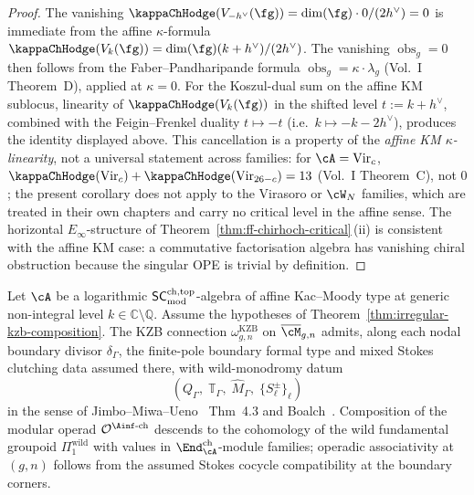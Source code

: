 \begin{proof}
The vanishing $\kappaChHodge(V_{-h^\vee}(\fg)) = \dim(\fg)\cdot 0/(2h^\vee)
= 0$ is immediate from the affine $\kappa$-formula
$\kappaChHodge(V_k(\fg)) = \dim(\fg)(k+h^\vee)/(2h^\vee)$. The vanishing
$\operatorname{obs}_g = 0$ then follows from the
Faber--Pandharipande formula
$\operatorname{obs}_g = \kappa\cdot\lambda_g$
(Vol.~I Theorem~D), applied at $\kappa = 0$. For the Koszul-dual
sum on the affine KM sublocus, linearity of
$\kappaChHodge(V_k(\fg))$ in the shifted level $t := k+h^\vee$, combined
with the Feigin--Frenkel duality $t \mapsto -t$
(i.e.\ $k \mapsto -k-2h^\vee$), produces the identity displayed
above. This cancellation is a property of the
\emph{affine KM $\kappa$-linearity}, not a universal statement
across families: for $\cA = \mathrm{Vir}_c$, $\kappaChHodge(\mathrm{Vir}_c)
+ \kappaChHodge(\mathrm{Vir}_{26-c}) = 13$ (Vol.~I Theorem~C), not $0$; the
present corollary does not apply to the Virasoro or $\cW_N$
families, which are treated in their own chapters and carry no
critical level in the affine sense. The horizontal
$E_\infty$-structure of
Theorem~\ref{thm:ff-chirhoch-critical}\,(ii) is consistent with the
affine KM case: a commutative factorisation algebra has vanishing
chiral obstruction because the singular OPE is trivial by definition.
\end{proof}

\begin{theorem}
\label{thm:irregular-kzb-composition-generic-level}

Let $\cA$ be a logarithmic $\mathsf{SC}^{\mathrm{ch,top}}_{\mathrm{mod}}$-algebra of affine Kac--Moody
type at generic non-integral level $k \in \mathbb{C} \setminus
\mathbb{Q}$. Assume the hypotheses of
Theorem~\ref{thm:irregular-kzb-composition}. The KZB connection
$\omega_{g,n}^{\mathrm{KZB}}$ on
$\overline{\cM}_{g,n}$ admits, along each nodal boundary divisor
$\delta_\Gamma$, the finite-pole boundary formal type and
mixed Stokes clutching data assumed there, with wild-monodromy datum
\[
 (Q_\Gamma,\; \mathbb{T}_\Gamma,\; \hat M_\Gamma,\;
 \{S_\ell^\pm\}_\ell)
\]
in the sense of Jimbo--Miwa--Ueno~\cite{JMU81} Thm~4.3 and
Boalch~\cite{Boalch2001,Boalch2014}. Composition of the modular
operad $\mathcal{O}^{\Ainf\text{-ch}}$ descends to the cohomology
of the wild fundamental groupoid $\Pi_1^{\mathrm{wild}}$ with
values in $\End^{\mathrm{ch}}_{\cA}$-module families; operadic
associativity at $(g,n)$ follows from the assumed Stokes cocycle
compatibility at the boundary corners.
\end{theorem}

